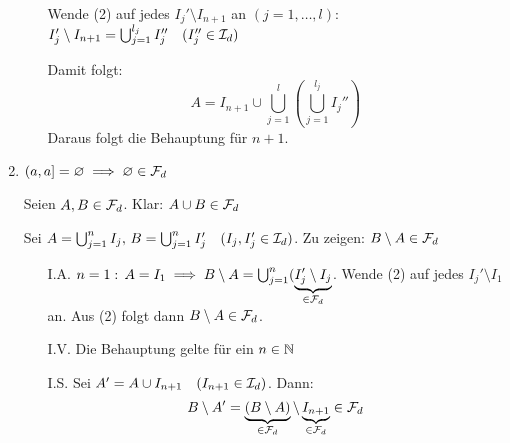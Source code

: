 \documentclass[a4paper,twoside,DIV15,BCOR12mm,chapterprefix=true,headings=onelinechapter]{scrbook}
\begin{document}
\begin{beweis}
\begin{enumerate}
\begin{itemize}
Wende (2) auf jedes \(I_{j}'\setminus I_{n+1}\) an \((j=1,\ldots,l)\): 
\(I_{j}'\setminus I_{n+1}=\bigcup_{j=1}^{l_{j}}{I_{j}''}\quad(I_{j}''\in\mathcal{I}_{d})\)

Damit folgt:
\[
A=I_{n+1}\cup\bigcup_{j=1}^{l}{\left(\bigcup_{j=1}^{l_{j}}{I_{j}''}\right)}
\]
Daraus folgt die Behauptung f\"ur \(n+1\).
\end{itemize}
\item \((a,a]=\varnothing\implies\varnothing\in\mathcal{F}_{d}\)

Seien \(A,B\in\mathcal{F}_{d}\). Klar: \(A\cup B\in\mathcal{F}_{d}\)

Sei \(A=\bigcup_{j=1}^{n}{I_{j}},\,B=\bigcup_{j=1}^{n}{I_{j}'}\quad(I_{j},I_{j}'\in\mathcal{I}_{d})\). Zu zeigen: \(B\setminus A\in\mathcal{F}_{d}\)
\begin{itemize}
\item[I.A.] \(n=1:\,A=I_{1}\implies B\setminus A=\bigcup_{j=1}^{n}(\underbrace{I_{j}'\setminus I_{j}}_{\in\mathcal{F}_{d}}\). Wende
(2) auf jedes \(I_{j}'\setminus I_{1}\) an. Aus (2) folgt dann \(B\setminus A\in\mathcal{F}_{d}\).
\item[I.V.] Die Behauptung gelte f\"ur ein \(n\in\mathbb{N}\)
\item[I.S.] Sei \(A'=A\cup I_{n+1}\quad(I_{n+1}\in\mathcal{I}_{d})\). Dann:
\[
B\setminus A'=\underbrace{(B\setminus A)}_{\in\mathcal{F}_{d}}\setminus\underbrace{I_{n+1}}_{\in\mathcal{F}_{d}}\in\mathcal{F}_{d}
\]
\end{itemize}
\end{enumerate}
\end{beweis}
\end{document}

